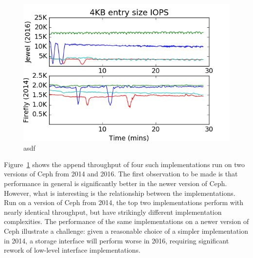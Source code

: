 \begin{figure}[t]
\centering
\includegraphics[width=1.0\linewidth]{jewel_v_firefly_pd.png}
\caption{asdf}
\label{fig:phy-design}
\end{figure}

Figure~\ref{fig:phy-design} shows the append throughput of four such
implementations run on two versions of Ceph from 2014 and 2016. The first
observation to be made is that performance in general is significantly better
in the newer version of Ceph. However, what is interesting is the relationship
between the implementations. Run on a version of Ceph from 2014, the top two
implementations perform with nearly identical throughput, but have strikingly
different implementation complexities. The performance of the same
implementations on a newer version of Ceph illustrate a challenge: given a
reasonable choice of a simpler implementation in 2014, a storage interface
will perform worse in 2016, requiring significant rework of low-level
interface implementations.

